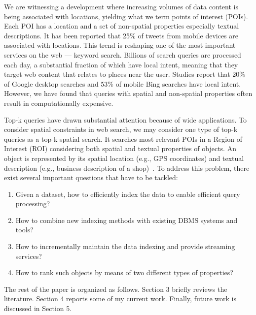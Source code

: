 \documentclass[11pt,a4paper]{article}
\begin{document}
 	We are witnessing a development where increasing volumes of data content is being associated with locations, yielding what we term points of interest (POIs). Each POI has a location and a set of non-spatial properties especially textual descriptions. It has been reported that 25\% of tweets from mobile devices are associated with locations. This trend is reshaping one of the most important services on the web --- keyword search. Billions of search queries are processed each day, a substantial fraction of which have local intent, meaning that they target web content that relates to places near the user. Studies report that 20\% of Google desktop searches and 53\% of mobile Bing searches have local intent. However, we have found that queries with spatial and non-spatial properties often result in computationally expensive. 
 	
 	Top-k queries have drawn substantial attention because of wide applications. To consider spatial constraints in web search, we may consider one type of top-k queries as a top-k spatial search. It searches most relevant POIs in a Region of Interest (ROI) considering both spatial and textual properties of objects. An object is represented by its spatial location (e.g., GPS coordinates) and textual description (e.g., business description of a shop)~\cite{cao2012spatial}. To address this problem, there exist several important questions that have to be tackled:
 	\begin{enumerate}
 		\item Given a dataset, how to efficiently index the data to enable efficient query processing?
 		\item How to combine new indexing methods with existing DBMS systems and tools?
 		\item How to incrementally maintain the data indexing and provide streaming services?
 		\item How to rank such objects by means of two different types of properties?
 	\end{enumerate}
 	
 	
 	The rest of the paper is organized as follows. Section 3 briefly reviews the literature. Section 4 reports some of my current work. Finally, future work is discussed in Section 5.
 	
\end{document}
